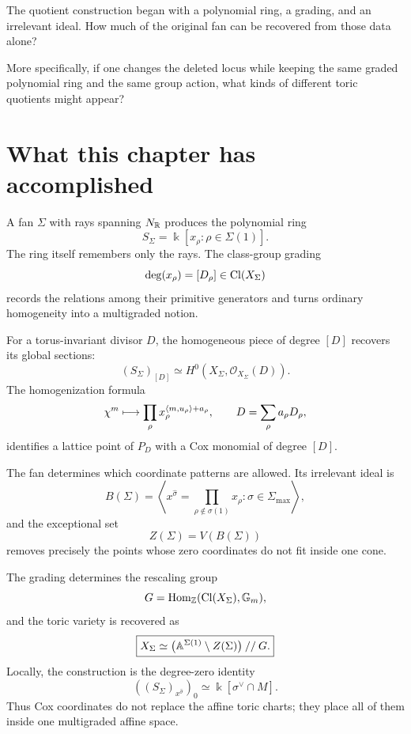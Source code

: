 \begin{guidingquestion}
The quotient construction began with a polynomial ring, a grading, and
an irrelevant ideal. How much of the original fan can be recovered
from those data alone?

More specifically, if one changes the deleted locus while keeping the
same graded polynomial ring and the same group action, what kinds of
different toric quotients might appear?
\end{guidingquestion}

\clearpage
\section*{What this chapter has accomplished}

A fan \(\Sigma\) with rays spanning \(N_{\mathbb{R}}\) produces the polynomial
ring
\[
S_\Sigma=\Bbbk[x_\rho:\rho\in\Sigma(1)].
\]
The ring itself remembers only the rays. The class-group grading
\[
\deg(x_\rho)=[D_\rho]\in\operatorname{Cl}(X_\Sigma)
\]
records the relations among their primitive generators and turns
ordinary homogeneity into a multigraded notion.

For a torus-invariant divisor \(D\), the homogeneous piece of degree
\([D]\) recovers its global sections:
\[
\boxed{
(S_\Sigma)_{[D]}
\simeq
H^0(X_\Sigma,\mathcal O_{X_\Sigma}(D)).
}
\]
The homogenization formula
\[
\chi^{m}
\longmapsto
\prod_\rho
x_\rho^{\langle m,u_\rho\rangle+a_\rho},
\qquad
D=\sum_\rho a_\rho D_\rho,
\]
identifies a lattice point of \(P_D\) with a Cox monomial of degree
\([D]\).

The fan determines which coordinate patterns are allowed. Its
irrelevant ideal is
\[
B(\Sigma)
=
\left\langle
x^{\widehat\sigma}
=
\prod_{\rho\notin\sigma(1)}x_\rho:
\sigma\in\Sigma_{\max}
\right\rangle,
\]
and the exceptional set
\[
Z(\Sigma)=V(B(\Sigma))
\]
removes precisely the points whose zero coordinates do not fit inside
one cone.

The grading determines the rescaling group
\[
G=\operatorname{Hom}_{\mathbb{Z}}(\operatorname{Cl}(X_\Sigma),\mathbb{G}_{m}),
\]
and the toric variety is recovered as
\[
\boxed{
X_\Sigma
\simeq
\bigl(\mathbb{A}^{\Sigma(1)}\setminus Z(\Sigma)\bigr)
\mathbin{//}G.
}
\]
Locally, the construction is the degree-zero identity
\[
\left((S_\Sigma)_{x^{\widehat\sigma}}\right)_0
\simeq
\Bbbk[\sigma^\vee\cap M].
\]
Thus Cox coordinates do not replace the affine toric charts; they
place all of them inside one multigraded affine space.


